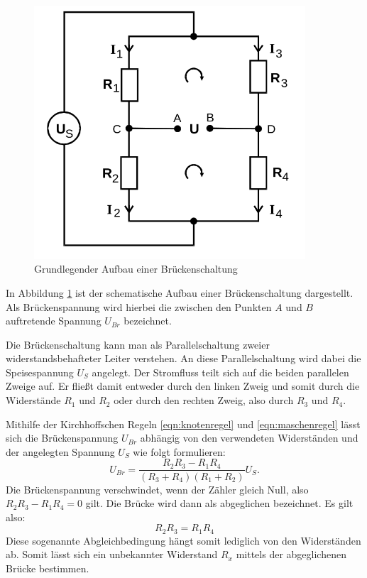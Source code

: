 \begin{figure}
  \centering
  \includegraphics[width=0.9\textwidth]{Bilder/brueckenschaltungallgemein.png}
  \caption{Grundlegender Aufbau einer Brückenschaltung \cite{Anleitung}}
  \label{fig:brückenschaltung}
\end{figure}
In Abbildung \ref{fig:brückenschaltung} ist der schematische Aufbau einer Brückenschaltung dargestellt.
Als Brückenspannung wird hierbei die zwischen den Punkten $A$ und $B$ auftretende Spannung $U_{Br}$ bezeichnet.

Die Brückenschaltung kann man als Parallelschaltung zweier widerstandsbehafteter Leiter verstehen. An diese Parallelschaltung wird dabei die Speisespannung $U_S$ angelegt.
Der Stromfluss teilt sich auf die beiden parallelen Zweige auf. Er fließt damit entweder durch den linken Zweig und somit durch die Widerstände $R_1$ und $R_2$ oder durch den rechten Zweig, also durch $R_3$ und $R_4$.

Mithilfe der Kirchhoffschen Regeln \eqref{eqn:knotenregel} und \eqref{eqn:maschenregel} lässt sich die Brückenspannung $U_{Br}$ abhängig von den verwendeten Widerständen und der angelegten Spannung $U_S$ wie folgt formulieren:
\begin{equation}
  \label{eqn:brückeeingang}
U_{Br}=\frac{R_2R_3-R_1R_4}{(R_3+R_4)(R_1+R_2)}U_S .
\end{equation}
Die Brückenspannung verschwindet, wenn der Zähler gleich Null, also $R_2R_3-R_1R_4=0$ gilt.
Die Brücke wird dann als abgeglichen bezeichnet. Es gilt also:
\begin{equation}
R_2R_3=R_1R_4
\label{eqn:abgleichbedingung}
\end{equation}
Diese sogenannte Abgleichbedingung hängt somit lediglich von den Widerständen ab. Somit lässt sich ein unbekannter Widerstand $R_x$ mittels der abgeglichenen Brücke bestimmen.

